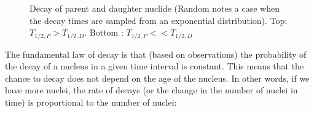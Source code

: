 \begin{figure}[ht!]
\protect {}\protect
\caption{\label{fig:decay} \footnotesize{Decay of parent and daughter nuclide (Random notes a case when the decay times are sampled from an exponential distribution). Top: $T_{1/2,P} > T_{1/2,D}$. Bottom	: $T_{1/2,P} << T_{1/2,D}$}}
\end{figure}

The fundamental law of decay is that (based on observations) the probability of the decay of a nucleus in a given time interval is constant. This means that the chance to decay does not depend on the age of the nucleus. In other words, if we have more nuclei, the rate of decays (or the change in the number of nuclei in time) is proportional to the number of nuclei:

